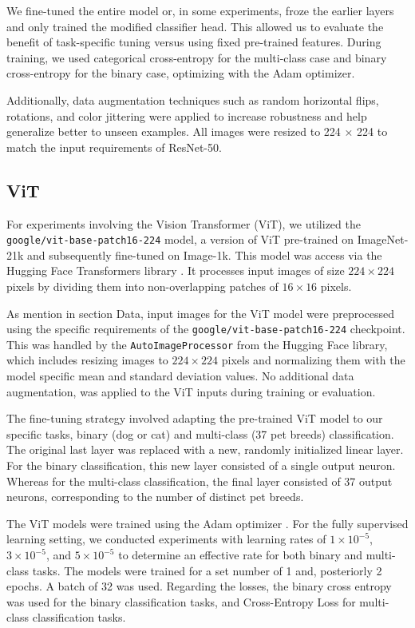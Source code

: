 \documentclass{article}
\begin{document}
We fine-tuned the entire model or, in some experiments, froze the earlier layers and only trained the modified classifier head. This allowed us to evaluate the benefit of task-specific tuning versus using fixed pre-trained features. During training, we used categorical cross-entropy for the multi-class case and binary cross-entropy for the binary case, optimizing with the Adam optimizer.

Additionally, data augmentation techniques such as random horizontal flips, rotations, and color jittering were applied to increase robustness and help generalize better to unseen examples. All images were resized to 224 × 224 to match the input requirements of ResNet-50.

\subsection{ViT}
For experiments involving the Vision Transformer (ViT), we utilized the \texttt{google/vit-base-patch16-224} model, a version of ViT pre-trained on ImageNet-21k and subsequently fine-tuned on Image-1k. This model was access via the Hugging Face Transformers library \citep{wolf-etal-2020-transformers}. It processes input images of size $224 \times 224$ pixels by dividing them into non-overlapping patches of $16 \times 16$ pixels.

As mention in section Data, input images for the ViT model were preprocessed using the specific requirements of the \texttt{google/vit-base-patch16-224} checkpoint. This was handled by the \texttt{AutoImageProcessor} from the Hugging Face library, which includes resizing images to $224 \times 224$ pixels and normalizing them with the model specific mean and standard deviation values. No additional data augmentation, was applied to the ViT inputs during training or evaluation.

The fine-tuning strategy involved adapting the pre-trained ViT model to our specific tasks, binary (dog or cat) and multi-class (37 pet breeds) classification. The original last layer was replaced with a new, randomly initialized linear layer. For the binary classification, this new layer consisted of a single output neuron. Whereas for the multi-class classification, the final layer consisted of 37 output neurons, corresponding to the number of distinct pet breeds.

The ViT models were trained using the Adam optimizer \citep{kingma2014adam}. For the fully supervised learning setting, we conducted experiments with learning rates of $1 \times 10^{-5}$, $3 \times 10^{-5}$, and $5 \times 10^{-5}$ to determine an effective rate for both binary and multi-class tasks. The models were trained for a set number of 1 and, posteriorly 2 epochs. A batch of 32 was used. Regarding the losses, the binary cross entropy was used for the binary classification tasks, and Cross-Entropy Loss for multi-class classification tasks. 
\end{document}
